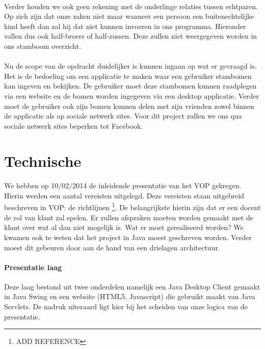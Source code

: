 \documentclass[pdftex,a4paper,12pt,twoside]{report}
\begin{document}
\paragraph{}
Verder houden we ook geen rekening met de onderlinge relaties tussen echtparen. Op zich zijn dat onze zaken niet maar wanneer een persoon een buitenechtelijke kind heeft dan zal hij dat niet kunnen invoeren in ons programma. Hieronder vallen dus ook half-broers of half-zussen. Deze zullen niet weergegeven worden in ons stamboom overzicht.

\paragraph{}
Nu de scope van de opdracht duidelijker is kunnen ingaan op wat er gevraagd is. Het is de bedoeling om een applicatie te maken waar een gebruiker stambomen kan ingeven en bekijken. De gebruiker moet deze stambomen kunnen raadplegen via een website  en de bomen worden ingegeven via een desktop applicatie. Verder moet de gebruiker ook zijn bomen kunnen delen met zijn vrienden zowel binnen de applicatie als op sociale netwerk sites. Voor dit project zullen we ons qua sociale netwerk sites beperken tot Facebook.

\section{Technische}
\paragraph{}
We hebben op 10/02/2014 de inleidende presentatie van het VOP gekregen. Hierin werden een aantal vereisten uitgelegd. Deze vereisten staan uitgebreid beschreven in VOP: de richtlijnen \footnote{ADD REFERENCE}. De belangrijkste hierin zijn dat er een docent de rol van klant zal spelen. Er zullen afspraken moeten worden gemaakt met de klant over wat al dan niet mogelijk is. Wat er moet gerealiseerd worden? We kwamen ook te weten dat het project in Java moest geschreven worden. Verder moest dit gebeuren door aan de hand van een drielagen architectuur. 

\paragraph{Presentatie laag}
Deze laag bestond uit twee onderdelen namelijk een Java Desktop Client gemaakt in Java Swing en een website (HTML5, Javascript) die gebruikt maakt van Java Servlets. De nadruk uiteraard ligt hier bij het scheiden van onze logica van de presentatie.
\end{document}
